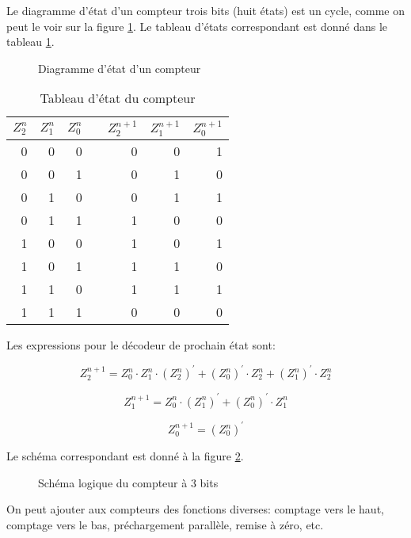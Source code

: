 \documentclass[letter, oneside]{book}
\begin{document}
\begin{enumerate}
Le diagramme d'état d'un compteur trois bits (huit états) est un
cycle, comme on peut le voir sur la figure \ref{fig:org1a51210}. Le tableau
d'états correspondant est donné dans le tableau \ref{tab:orgf72be71}.


\begin{figure}[htbp]
\centering

\caption{\label{fig:org1a51210}Diagramme d'état d'un compteur}
\end{figure}

\begin{table}[htbp]
\caption{\label{tab:orgf72be71}Tableau d'état du compteur}
\centering
\begin{tabular}{rrrlrrr}
\(Z_2^n\) & \(Z_1^n\) & \(Z_0^n\) &  & \(Z_2^{n+1}\) & \(Z_1^{n+1}\) & \(Z_0^{n+1}\)\\[0pt]
\hline
0 & 0 & 0 &  & 0 & 0 & 1\\[0pt]
0 & 0 & 1 &  & 0 & 1 & 0\\[0pt]
0 & 1 & 0 &  & 0 & 1 & 1\\[0pt]
0 & 1 & 1 &  & 1 & 0 & 0\\[0pt]
1 & 0 & 0 &  & 1 & 0 & 1\\[0pt]
1 & 0 & 1 &  & 1 & 1 & 0\\[0pt]
1 & 1 & 0 &  & 1 & 1 & 1\\[0pt]
1 & 1 & 1 &  & 0 & 0 & 0\\[0pt]
\end{tabular}
\end{table}

Les expressions pour le décodeur de prochain état sont: 

$$  Z_2^{n+1} = Z_0^n \cdot Z_1^n \cdot (Z_2^{n})^\prime + (Z_0^{n})^\prime \cdot Z_2^n + (Z_1^{n})^\prime \cdot Z_2^n $$

$$  Z_1^{n+1} = Z_0^{n} \cdot (Z_1^{n})^\prime + (Z_0^{n})^\prime \cdot Z_1^n $$

$$  Z_0^{n+1} = (Z_0^{n})^\prime $$


Le schéma correspondant est donné à la figure \ref{fig:org80fffa0}.

\begin{figure}[htbp]
\centering

\caption{\label{fig:org80fffa0}Schéma logique du compteur à 3 bits}
\end{figure}

On peut ajouter aux compteurs des fonctions diverses: comptage vers le
haut, comptage vers le bas, préchargement parallèle, remise à zéro,
etc.


\end{enumerate}
\end{document}
